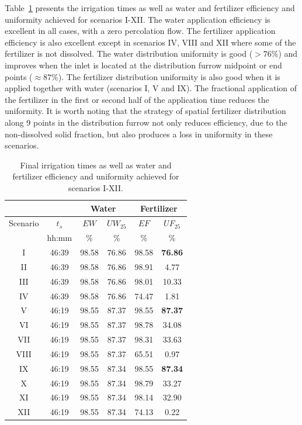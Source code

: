 \documentclass[review,authoryear]{elsarticle}
\begin{document}
Table~\ref{TabFurrowNetwork} presents the irrigation times as well as water and
fertilizer efficiency and uniformity achieved for scenarios I-XII.  The water application efficiency is excellent in all cases, with a
zero percolation flow. The fertilizer application efficiency is also excellent
except in scenarios IV, VIII and XII where some of the fertilizer is not dissolved. 
The water distribution uniformity is good ($>76\%$) and improves when the inlet
is located at the distribution furrow midpoint or end points ($\approx 87\%$).
The fertilizer distribution uniformity is also good when it is applied together
with water (scenarios I, V and IX). The fractional application of the fertilizer in
the first or second half of the application time reduces the uniformity. It is
worth noting that the strategy of spatial fertilizer distribution along 9 points
in the distribution furrow not only reduces efficiency, due to the non-dissolved
solid fraction, but also produces a loss in uniformity in these scenarios.

\begin{table}[ht!]
\centering
\caption{Final irrigation times as well as water and fertilizer
efficiency and uniformity achieved for scenarios I-XII.\label{TabFurrowNetwork}}
\footnotesize
\begin{tabular}{|c|c|cc|cc|}
\hline
&&\multicolumn{2}{|c|}{Water}&\multicolumn{2}{|c|}{Fertilizer}\\
\hline
Scenario&$t_s$&$EW$&$UW_{25}$&$EF$&$UF_{25}$\\
&hh:mm&\%&\%&\%&\%\\
\hline
I&46:39&98.58&76.86&98.58&\bf 76.86\\
II&46:39&98.58&76.86&98.91&4.77\\
III&46:39&98.58&76.86&98.01&10.33\\
IV&46:39&98.58&76.86&74.47&1.81\\
V&46:19&98.55&87.37&98.55&\bf 87.37\\
VI&46:19&98.55&87.37&98.78&34.08\\
VII&46:19&98.55&87.37&98.31&33.63\\
VIII&46:19&98.55&87.37&65.51&0.97\\
IX&46:19&98.55&87.34&98.55&\bf 87.34\\
X&46:19&98.55&87.34&98.79&33.27\\
XI&46:19&98.55&87.34&98.14&32.90\\
XII&46:19&98.55&87.34&74.13&0.22\\
\hline
\end{tabular}
\end{table}
\end{document}
